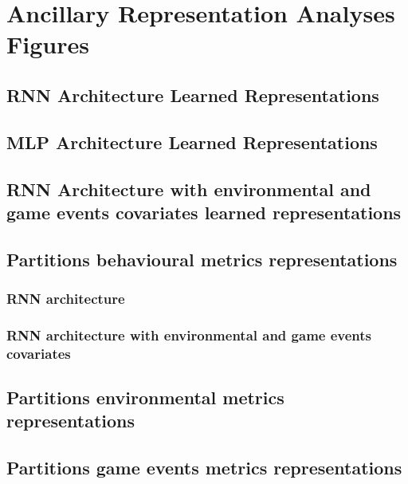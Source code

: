 \chapter{Ancillary Representation Analyses Figures}

\section{RNN Architecture Learned Representations}
\label{rnn_architecture_representations}

\section{MLP Architecture Learned Representations}
\label{mlp_architecture_representations}

\section{RNN Architecture with environmental and game events covariates learned representations}
\label{rnn_env_even_architecture_representations}

\section{Partitions behavioural metrics representations}
\label{partitions_behavioural}

\subsection{RNN architecture}

\subsection{RNN architecture with environmental and game events covariates }

\section{Partitions environmental metrics representations}
\label{partitions_environmental}

\section{Partitions game events metrics representations}
\label{partitions_game_events}